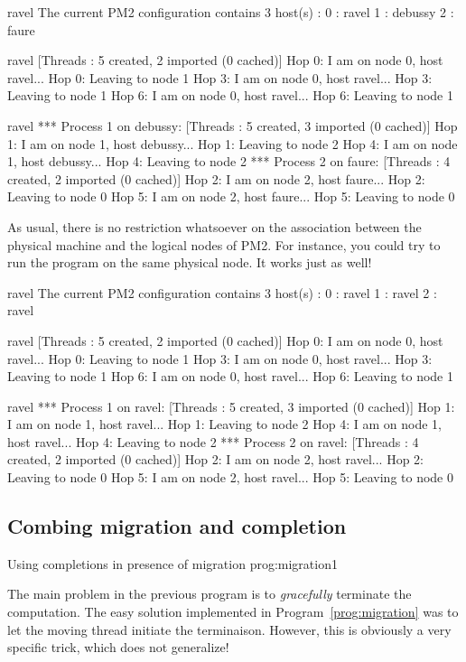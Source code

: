 \begin{shell}
ravel%
The current PM2 configuration contains 3 host(s) :
0 : ravel
1 : debussy
2 : faure

ravel%
[Threads : 5 created, 2 imported (0 cached)]
Hop 0: I am on node 0, host ravel...
Hop 0: Leaving to node 1
Hop 3: I am on node 0, host ravel...
Hop 3: Leaving to node 1
Hop 6: I am on node 0, host ravel...
Hop 6: Leaving to node 1

ravel%
*** Process 1 on debussy:
[Threads : 5 created, 3 imported (0 cached)]
Hop 1: I am on node 1, host debussy...
Hop 1: Leaving to node 2
Hop 4: I am on node 1, host debussy...
Hop 4: Leaving to node 2
*** Process 2 on faure:
[Threads : 4 created, 2 imported (0 cached)]
Hop 2: I am on node 2, host faure...
Hop 2: Leaving to node 0
Hop 5: I am on node 2, host faure...
Hop 5: Leaving to node 0
\end{shell}
As usual, there is no restriction whatsoever on the association
between the physical machine and the logical nodes of PM2. For
instance, you could try to run the program on the same physical node.
It works just as well!
\begin{shell}
ravel%
The current PM2 configuration contains 3 host(s) :
0 : ravel
1 : ravel
2 : ravel

ravel%
[Threads : 5 created, 2 imported (0 cached)]
Hop 0: I am on node 0, host ravel...
Hop 0: Leaving to node 1
Hop 3: I am on node 0, host ravel...
Hop 3: Leaving to node 1
Hop 6: I am on node 0, host ravel...
Hop 6: Leaving to node 1

ravel%
*** Process 1 on ravel:
[Threads : 5 created, 3 imported (0 cached)]
Hop 1: I am on node 1, host ravel...
Hop 1: Leaving to node 2
Hop 4: I am on node 1, host ravel...
Hop 4: Leaving to node 2
*** Process 2 on ravel:
[Threads : 4 created, 2 imported (0 cached)]
Hop 2: I am on node 2, host ravel...
Hop 2: Leaving to node 0
Hop 5: I am on node 2, host ravel...
Hop 5: Leaving to node 0
\end{shell}

\subsection{Combing migration and completion}

 {Using completions in presence of
  migration} {prog:migration1}

The main problem in the previous program is to \emph{gracefully} terminate
the computation. The easy solution implemented in
Program~\ref{prog:migration} was to let the moving thread initiate the
terminaison. However, this is obviously a very specific trick, which
does not generalize!

